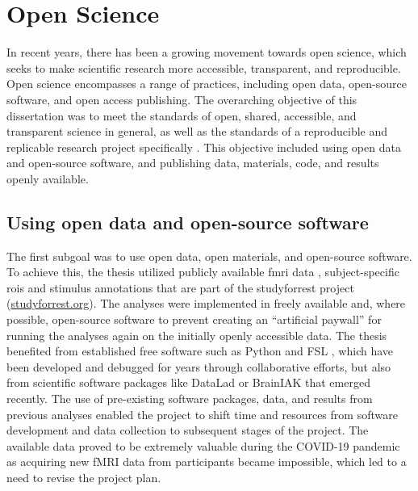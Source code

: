 \section{Open Science}

In recent years, there has been a growing movement towards open science, which
seeks to make scientific research more accessible, transparent, and
reproducible.
%
Open science encompasses a range of practices, including open data, open-source
software, and open access publishing.
%
The overarching objective of this dissertation was to meet the standards of
open, shared, accessible, and transparent science in general, as well as the
standards of a reproducible and replicable research project specifically
\citep[cf.][]{watson2015will, fecher2014open}.
%
This objective included using open data and open-source software, and publishing
data, materials, code, and results openly available.


\subsection{Using open data and open-source software}

%
The first subgoal was to use open data, open materials, and open-source
software.
%
To achieve this, the thesis utilized publicly available
%
\ac{fmri} data \citep{hanke2014audiomovie, hanke2016simultaneous,
sengupta2016extension},
%
subject-specific \acp{roi} \citep{sengupta2016extension} and
%
stimulus annotations \citep{haeusler2016cutanno}
%
that are part of the studyforrest project
(\href{www.studyforrest.org}{\url{studyforrest.org}}).
%
The analyses were implemented in freely available and, where possible,
open-source software to prevent creating an ``artificial paywall'' for running
the analyses again on the initially openly accessible data.
%
The thesis benefited from established free software such as
%
Python and
%
FSL \citep[\href{https://www.fmrib.ox.ac.uk/fsl}{FMRIB's Software
Library;}][]{smith2004fsl}, which have been developed and debugged for years
through collaborative efforts,
%
but also from scientific software packages like
%
DataLad
\citep[\href{www.datalad.org}{\url{datalad.org}};][]{halchenko2021datalad} or
%
BrainIAK
\citep[\href{https://brainiak.org}{\url{brainiak.org}};][]{kumar2020brainiak,
kumar2020brainiaktutorial}
%
that emerged recently.
%
The use of pre-existing software packages, data, and results from previous
analyses enabled the project to shift time and resources from software
development and data collection to subsequent stages of the project.
%
The available data proved to be extremely valuable during the COVID-19 pandemic
as acquiring new fMRI data from participants became impossible, which led to a
need to revise the project plan.

